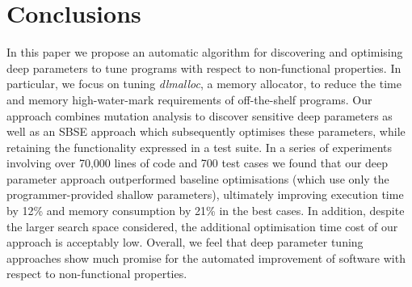 \vspace{-2mm}
\section{Conclusions}

In this paper we propose an automatic algorithm for discovering and
optimising deep parameters to tune programs with respect to non-functional
properties.  In particular, we focus on tuning \emph{dlmalloc}, a memory
allocator, to reduce the time and memory high-water-mark requirements of
off-the-shelf programs. Our approach combines mutation analysis to
discover sensitive deep parameters as well as an SBSE approach which 
subsequently optimises these parameters, while retaining the functionality expressed in
a test suite.  In a series of experiments involving over 70,000 lines of
code and 700 test cases we found that our deep parameter approach
outperformed baseline optimisations (which use only the programmer-provided
shallow parameters), ultimately improving execution time by 12\% 
and memory consumption by 21\% in the best cases. In addition, despite
the larger search space considered, the additional optimisation time cost
of our approach is acceptably low. Overall, we feel that deep parameter tuning 
approaches show much promise for the automated improvement of software
with respect to non-functional properties.  



\vspace{-2mm}
